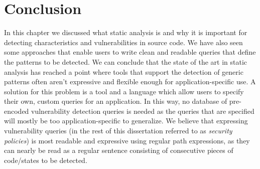 

\section{Conclusion}
In this chapter we discussed what static analysis is and why it is important for detecting characteristics and vulnerabilities in source code. We have also seen some approaches that enable users to write clean and readable queries that define the patterns to be detected. We can conclude that the state of the art in static analysis has reached a point where tools that support the detection of generic patterns often aren't expressive and flexible enough for application-specific use. A solution for this problem is a tool and a language which allow users to specify their own, custom queries for an application. In this way, no database of pre-encoded vulnerability detection queries is needed as the queries that are specified will mostly be too application-specific to generalize. We believe that expressing vulnerability queries (in the rest of this dissertation referred to as \textit{security policies}) is most readable and expressive using regular path expressions, as they can nearly be read as a regular sentence consisting of consecutive pieces of code/states to be detected.